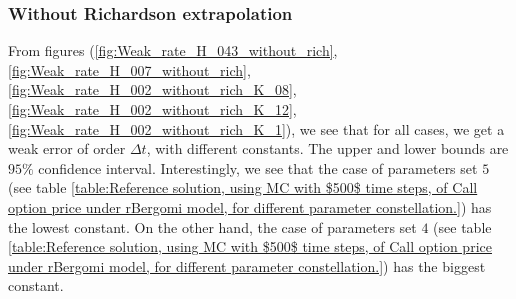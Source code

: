 \documentclass[11pt]{article}
\begin{document}
\subsubsection{Without Richardson extrapolation}
From figures (\ref{fig:Weak_rate_H_043_without_rich},\ref{fig:Weak_rate_H_007_without_rich},\ref{fig:Weak_rate_H_002_without_rich_K_08},\ref{fig:Weak_rate_H_002_without_rich_K_12},\ref{fig:Weak_rate_H_002_without_rich_K_1}), we see that for all cases, we get a weak error of order $\Delta t$, with different  constants. The upper and lower bounds are $95\%$ confidence interval. Interestingly, we see that the case of parameters set $5$ (see table \ref{table:Reference solution, using MC with $500$ time steps, of Call option price under rBergomi model, for different parameter constellation.}) has the lowest constant. On the other hand, the case of parameters set $4$ (see table \ref{table:Reference solution, using MC with $500$ time steps, of Call option price under rBergomi model, for different parameter constellation.}) has the biggest constant.
\end{document}
